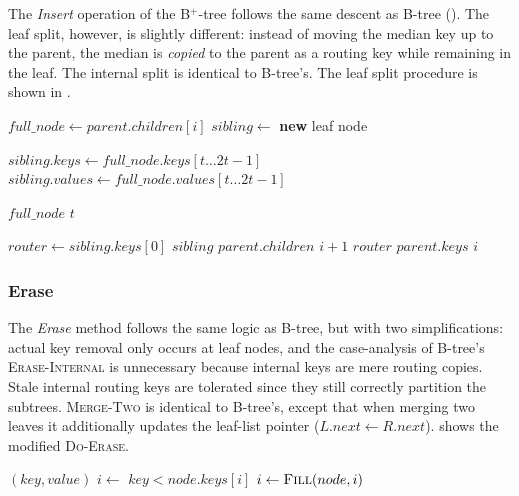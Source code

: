 \documentclass[sigconf]{acmart}
\begin{document}
The \textit{Insert} operation of the B$^+$-tree follows the same descent as B-tree (). The leaf split, however, is slightly different: instead of moving the median key up to the parent, the median is \emph{copied} to the parent as a routing key while remaining in the leaf. The internal split is identical to B-tree's. The leaf split procedure is shown in .

\begin{algorithm}[tbp]
\caption{B+ Tree Insert Algorithm}
\label{alg:bplus-insert}
\begin{algorithmic}[1]
    \State $full\_node \gets parent.children[i]$
    \State $sibling \gets$ \textbf{new} leaf node

    \State $sibling.keys \gets full\_node.keys[t \dots 2t-1]$
    \State $sibling.values \gets full\_node.values[t \dots 2t-1]$
    
    \State {} $full\_node$  $t$ 
    \State {}
    
    \State $router \gets sibling.keys[0]$
    \State {} $sibling$  $parent.children$  $i+1$
    \State {} $router$  $parent.keys$  $i$
\EndProcedure


    \State {}
\EndProcedure
\end{algorithmic}
\end{algorithm}

\subsubsection{Erase}

The \textit{Erase} method follows the same logic as B-tree, but with two simplifications: actual key removal only occurs at leaf nodes, and the case-analysis of B-tree's \textsc{Erase-Internal} is unnecessary because internal keys are mere routing copies. Stale internal routing keys are tolerated since they still correctly partition the subtrees. \textsc{Merge-Two} is identical to B-tree's, except that when merging two leaves it additionally updates the leaf-list pointer ($L.next \gets R.next$).  shows the modified \textsc{Do-Erase}.

\begin{algorithm}[tbp]
\caption{B+ Tree Erase Algorithm}
\label{alg:bplus-erase}
\begin{algorithmic}[1]
            \State {} $(key, value)$
        \EndIf
        \State \Return
    \EndIf
    \State $i \gets$  $key < node.keys[i]$
        \State $i \gets \Call{Fill}{node, i}$
    \EndIf
    \State {}
\EndProcedure
\end{algorithmic}
\end{algorithm}
\end{document}
